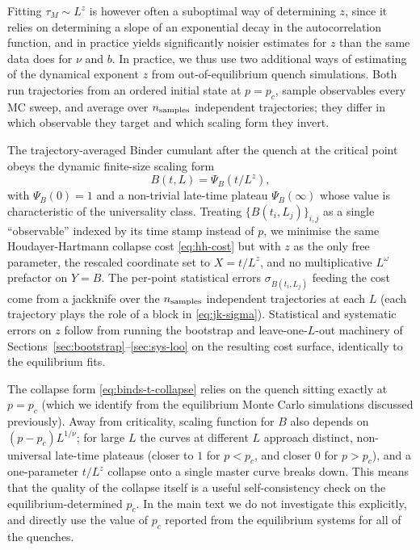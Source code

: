 \documentclass[pra,aps,twocolumn,groupedaddress,superscriptaddress,nofootinbib,preprintnumbers]{revtex4-2}
\begin{document}
\begin{widetext}
		Fitting $\tau_M \sim L^z$ is however often a suboptimal way of determining $z$, since it relies on determining a slope of an exponential decay in the autocorrelation function, and in practice yields significantly noisier estimates for $z$ than the same data does for $\nu$ and $b$. In practice, we thus use two additional ways of estimating of the dynamical exponent $z$ from
		out-of-equilibrium quench simulations. Both run trajectories from
		an ordered initial state at $p = p_c$, sample observables every MC
		sweep, and average over $n_{\rm samples}$ independent trajectories;
		they differ in which observable they target and which scaling form
		they invert.
		
		
		The trajectory-averaged Binder cumulant after the quench at the critical point obeys the
		dynamic finite-size scaling form
		\begin{equation}
			B(t, L) = \Psi_B(t/L^z),
			\label{eq:binds-t-collapse}
		\end{equation}
		with $\Psi_B(0) = 1$ and a non-trivial late-time plateau $\Psi_B(\infty)$ whose value is characteristic of the universality
		class. Treating $\{B(t_i, L_j)\}_{i,j}$ as a single
		``observable'' indexed by its time stamp instead of $p$, we minimise
		the same Houdayer-Hartmann collapse cost \eqref{eq:hh-cost} but with
		$z$ as the only free parameter, the rescaled coordinate set to $X =
		t/L^z$, and no multiplicative $L^{\omega}$ prefactor on $Y = B$. The
		per-point statistical errors $\sigma_{B(t_i, L_j)}$ feeding the cost
		come from a jackknife over the $n_{\rm samples}$ independent
		trajectories at each $L$ (each trajectory plays the role of a block
		in \eqref{eq:jk-sigma}). Statistical and systematic errors on $z$
		follow from running the bootstrap and leave-one-$L$-out machinery of
		Sections~\ref{sec:bootstrap}--\ref{sec:sys-loo} on the resulting
		cost surface, identically to the equilibrium fits.
		
		The collapse form \eqref{eq:binds-t-collapse} relies on the quench
		sitting exactly at $p = p_c$ (which we identify from the equilibrium Monte Carlo simulations discussed previously). Away from criticality, scaling function for $B$ also depends on $(p-p_c) L^{1/\nu}$; for large $L$ the curves at different $L$ approach
		distinct, non-universal late-time plateaus (closer to $1$ for $p < p_c$, and closer $0$ for $p > p_c$), and a one-parameter $t/L^z$ collapse onto a
		single master curve breaks down. This means that the
		quality of the collapse itself is a useful self-consistency check on
		the equilibrium-determined $p_c$. In the main text we do not investigate this explicitly, and directly use the value of $p_c$ reported from the equilibrium systems for all of the quenches. 
		

\end{widetext}
\end{document}
